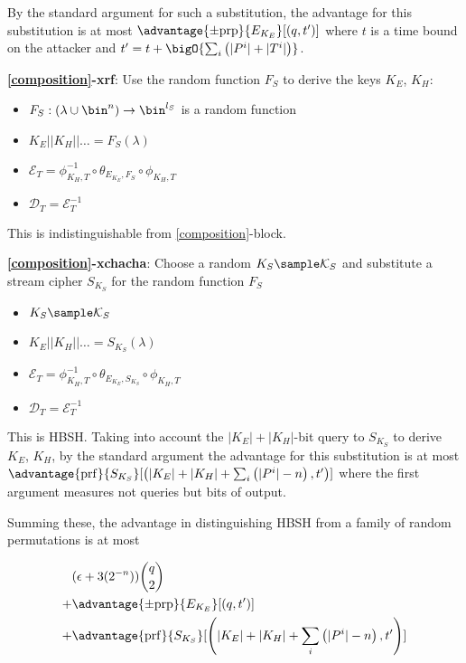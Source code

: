 \documentclass[journal=tosc,preprint,floatrow,submission]{iacrtrans}
\newcommand*{\xprm}[2]{\textsf{\ref*{#1}-#2}}
\newcommand*{\xprmtitle}[2]{\textbf{\xprm{#1}{#2}}}
\newcommand*{\calE}{\mathcal{E}}
\newcommand*{\calD}{\mathcal{D}}
\begin{document}
By the standard argument
for such a substitution, the advantage for this substitution is at most
$\advantage{\pm \mathrm{prp}}{E_{K_E}}[(q, t')]$ where $t$ is a time bound on the attacker and
$t' = t + \bigO{\sum_i \left( |P^i| + |T^i| \right)}$.

\xprmtitle{composition}{xrf}: Use the random function $F_S$ to derive the keys
$K_E$, $K_H$:

\begin{itemize}
    \item $F_S: (\lambda \cup \bin^n) \rightarrow \bin^{l_S}$ is a random function
    \item $K_E || K_H || \ldots = F_S(\lambda)$
    \item $\calE_T = \phi^{-1}_{K_H, T} \circ \theta_{E_{K_E}, F_S} \circ \phi_{K_H, T}$
    \item $\calD_T = \calE_T^{-1}$
\end{itemize}

This is indistinguishable from \xprm{composition}{block}.

\xprmtitle{composition}{xchacha}: Choose a random $K_S \sample \mathcal{K}_S$ and
substitute a stream cipher $S_{K_S}$ for the random function $F_S$

\begin{itemize}
    \item $K_S \sample \mathcal{K}_S$
    \item $K_E || K_H || \ldots = S_{K_S}(\lambda)$
    \item $\calE_T = \phi^{-1}_{K_H, T} \circ \theta_{E_{K_E}, S_{K_S}} \circ \phi_{K_H, T}$
    \item $\calD_T = \calE_T^{-1}$
\end{itemize}

This is HBSH. Taking into account the $|K_E| + |K_H|$-bit
query to $S_{K_S}$ to derive $K_E$, $K_H$,
by the standard argument the advantage for this substitution is at most
$\advantage{\mathrm{prf}}{S_{K_S}}[\left(|K_E| + |K_H| + \sum_i \left(|P^i|-n\right), t'\right)]$
where the first argument measures not queries but bits of output.

Summing these,
the advantage in distinguishing HBSH from a family of random permutations is at most

\begin{align*}
& (\epsilon + 3(2^{-n}))\binom{q}{2} \\
+& \advantage{\pm \mathrm{prp}}{E_{K_E}}[(q, t')] \\
+& \advantage{\mathrm{prf}}{S_{K_S}}[\left(|K_E| + |K_H| + \sum_i \left(|P^i|-n\right), t'\right)]
\end{align*}
\end{document}
